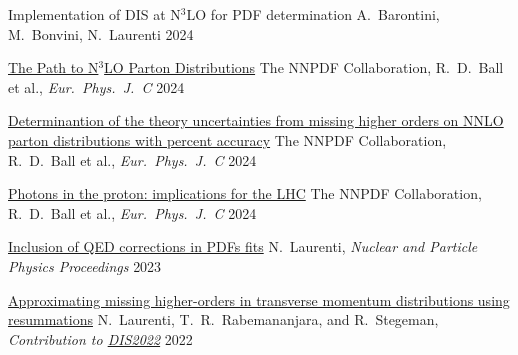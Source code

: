 
\begin{cvhonors}

    \cvhonor
    {Implementation of DIS at N$^3$LO for PDF determination} %
    {A.\ Barontini, M.\ Bonvini, N.\ Laurenti} %
    {}
    {2024}
    
    \cvhonor
    {\href{https://arxiv.org/pdf/2402.18635.pdf}{The Path to N$^3$LO Parton Distributions}} %
    {The NNPDF Collaboration, R.\ D.\ Ball et al., \emph{Eur.\ Phys.\ J.\ C}} %
    {}
    {2024}
    
    \cvhonor
    {\href{https://arxiv.org/pdf/2401.10319.pdf}{Determinantion of the theory uncertainties from missing higher orders on NNLO parton distributions with percent accuracy}} %
    {The NNPDF Collaboration, R.\ D.\ Ball et al., \emph{Eur.\ Phys.\ J.\ C}} %
    {}
    {\vspace{0.35cm}2024}
    
    \cvhonor
    {\href{https://arxiv.org/pdf/2401.08749.pdf}{Photons in the proton: implications for the LHC}} %
    {The NNPDF Collaboration, R.\ D.\ Ball et al., \emph{Eur.\ Phys.\ J.\ C}} %
    {}
    {2024}

    \cvhonor
    {\href{https://doi.org/10.1016/j.nuclphysbps.2023.11.013}{Inclusion of QED corrections in PDFs ﬁts}}
    {N.\ Laurenti, \textit{Nuclear and Particle Physics Proceedings}}
    {}
    {2023}
    
    \cvhonor
    {\href{https://arxiv.org/abs/2207.12265}{Approximating missing higher-orders in transverse momentum distributions using resummations}}
    {N.~Laurenti, T.\ R.\ Rabemananjara, and R.\ Stegeman, \emph{Contribution to \href{https://inspirehep.net/conferences/1914506?ui-citation-summary=true}{DIS2022}}}
    {}
    {\vspace{0.35cm}2022}

\end{cvhonors}
